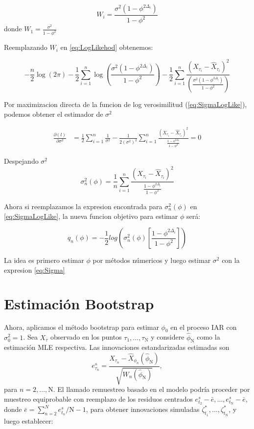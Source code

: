 $$W_i = \frac{\sigma^2(1-\phi^{2\Delta_i})}{1-\phi^2}$$
donde $W_1= \frac{\sigma^2}{1-\phi^2}$

Reemplazando $W_i$ en \ref{eq:LogLikehod} obtenemos:


\begin{equation}
    -\frac{n}{2}\log(2\pi)-\frac{1}{2}\sum_{i=1}^{n}\log\left(\frac{\sigma^2(1-\phi^{2\Delta_i})}{1-\phi^2}\right)  -\frac{1}{2}\sum_{i=1}^{n}\frac{\left( X_{\tau_i} - \hat{X}_{\tau_i}\right)^2}{\left(\frac{\sigma^2(1-\phi^{2\Delta_i})}{1-\phi^2}\right)}
    \label{eq:SigmaLogLike}
\end{equation}

Por maximizacion directa de la funcion de log verosimilitud (\ref{eq:SigmaLogLike}), podemos obtener el estimador de $\sigma^2$

\begin{equation}
   \begin{split}
   \frac{\partial(l)}{\partial \sigma^2} &= \frac{1}{2}\sum_{i=1}^{n}\frac{1}{\sigma^2} - \frac{1}{2(\sigma^2)^2}\sum_{i=1}^{n}\frac{\left( X_{\tau_i} - \hat{X}_{\tau_i}\right)^2}{\frac{1-\phi^{2\Delta_i}}{1-\phi^2}} = 0
   \end{split}
\end{equation}

Despejando $\sigma^2$
\begin{equation}
    \sigma_n^2(\phi) = \frac{1}{n}\sum_{i=1}^{n}\frac{\left( X_{\tau_i} - \hat{X}_{\tau_i}\right)^2}{\frac{1-\phi^{2\Delta_i}}{1-\phi^2}}
    \label{eq:Sigma}
 \end{equation}

Ahora si reemplazamos la expresion encontrada para $\sigma_n^2(\phi)$ en \ref{eq:SigmaLogLike}, la nueva funcion objetivo para estimar $\phi$ será:

\begin{equation}
    q_n(\phi) = -\frac{1}{2}log\left(\sigma_n^2(\phi)\left[\frac{1-\phi^{2\Delta_i}}{1-\phi^2}\right]\right)
    \label{eq:Objetive}
\end{equation}

La idea es primero estimar $\phi$ por métodos númericos y luego estimar $\sigma^2$ con la expresion \ref{eq:Sigma}
\section{Estimación Bootstrap}

Ahora, aplicamos el método bootstrap para estimar $\phi_0$ 
en el proceso IAR con $\sigma_0^2=1$. Sea $X_\tau$ observado en los puntos $\tau_1, \ldots, \tau_{\mathrm{N}}$ y 
considere $\hat{\phi}_{\mathrm{N}}$ como la estimación MLE respectiva. Las innovaciones estandarizadas estimadas son
$$
e_{\tau_n}^s=\frac{X_{\tau_n}-\hat{X}_{\phi_n}\left(\hat{\phi}_{\mathrm{N}}\right)}{\sqrt{W_n\left(\hat{\phi}_{\mathrm{N}}\right)}},
$$
para $n=2, \ldots, \mathrm{N}$. El llamado remuestreo basado en el modelo podría proceder por muestreo equiprobable 
con reemplazo de los residuos centrados $e_{t_2}^s-\bar{e}, \ldots, e_{t_{\mathrm{N}}}^s-\bar{e}$, donde $\bar{e}=\sum_{n=2}^N e_{t_n}^s / \mathrm{N}-1$,
para obtener innovaciones simuladas $\zeta_{t_1}^*, \ldots, \zeta_{t_{\mathrm{N}}}^*$, y luego establecer:

